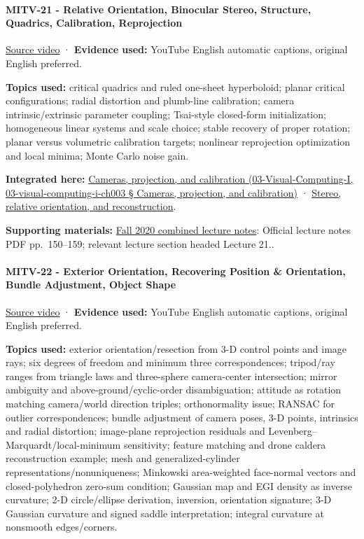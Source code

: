 \paragraph{MITV-21 - Relative Orientation, Binocular Stereo, Structure, Quadrics, Calibration, Reprojection}\label{mitv-21---relative-orientation-binocular-stereo-structure-quadrics-calibration-reprojection}

\href{https://www.youtube.com/watch?v=-n0cXgPSwOw}{Source video} · \textbf{Evidence used:} YouTube English automatic captions, original English preferred.

\textbf{Topics used:} critical quadrics and ruled one-sheet hyperboloid; planar critical configurations; radial distortion and plumb-line calibration; camera intrinsic/extrinsic parameter coupling; Tsai-style closed-form initialization; homogeneous linear systems and scale choice; stable recovery of proper rotation; planar versus volumetric calibration targets; nonlinear reprojection optimization and local minima; Monte Carlo noise gain.

\textbf{Integrated here:} \href{}{Cameras, projection, and calibration (03-Visual-Computing-I, 03-visual-computing-i-ch003 § Cameras, projection, and calibration)} · \hyperref[04-visual-computing-ii-ch032]{Stereo, relative orientation, and reconstruction}.

\textbf{Supporting materials:} \href{https://ocw.mit.edu/courses/6-801-machine-vision-fall-2020/9ec44f69e72995c370b3797818ba01e6_MIT6_801F20_lectureNotes.pdf}{Fall 2020 combined lecture notes}: Official lecture notes PDF pp.~150--159; relevant lecture section headed Lecture 21..

\paragraph{MITV-22 - Exterior Orientation, Recovering Position \& Orientation, Bundle Adjustment, Object Shape}\label{mitv-22---exterior-orientation-recovering-position-orientation-bundle-adjustment-object-shape}

\href{https://www.youtube.com/watch?v=x4F1oqm7ETk}{Source video} · \textbf{Evidence used:} YouTube English automatic captions, original English preferred.

\textbf{Topics used:} exterior orientation/resection from 3-D control points and image rays; six degrees of freedom and minimum three correspondences; tripod/ray ranges from triangle laws and three-sphere camera-center intersection; mirror ambiguity and above-ground/cyclic-order disambiguation; attitude as rotation matching camera/world direction triples; orthonormality issue; RANSAC for outlier correspondences; bundle adjustment of camera poses, 3-D points, intrinsics and radial distortion; image-plane reprojection residuals and Levenberg--Marquardt/local-minimum sensitivity; feature matching and drone caldera reconstruction example; mesh and generalized-cylinder representations/nonuniqueness; Minkowski area-weighted face-normal vectors and closed-polyhedron zero-sum condition; Gaussian map and EGI density as inverse curvature; 2-D circle/ellipse derivation, inversion, orientation signature; 3-D Gaussian curvature and signed saddle interpretation; integral curvature at nonsmooth edges/corners.

